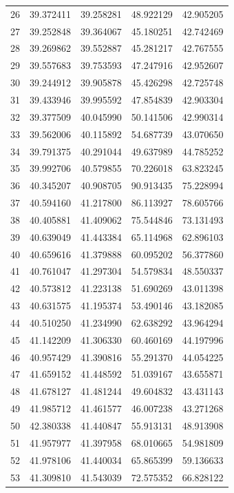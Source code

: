\begin{table}
\begin{tabular}{rrrrr}
26 & 39.372411 & 39.258281 & 48.922129 & 42.905205 \\
27 & 39.252848 & 39.364067 & 45.180251 & 42.742469 \\
28 & 39.269862 & 39.552887 & 45.281217 & 42.767555 \\
29 & 39.557683 & 39.753593 & 47.247916 & 42.952607 \\
30 & 39.244912 & 39.905878 & 45.426298 & 42.725748 \\
31 & 39.433946 & 39.995592 & 47.854839 & 42.903304 \\
32 & 39.377509 & 40.045990 & 50.141506 & 42.990314 \\
33 & 39.562006 & 40.115892 & 54.687739 & 43.070650 \\
34 & 39.791375 & 40.291044 & 49.637989 & 44.785252 \\
35 & 39.992706 & 40.579855 & 70.226018 & 63.823245 \\
36 & 40.345207 & 40.908705 & 90.913435 & 75.228994 \\
37 & 40.594160 & 41.217800 & 86.113927 & 78.605766 \\
38 & 40.405881 & 41.409062 & 75.544846 & 73.131493 \\
39 & 40.639049 & 41.443384 & 65.114968 & 62.896103 \\
40 & 40.659616 & 41.379888 & 60.095202 & 56.377860 \\
41 & 40.761047 & 41.297304 & 54.579834 & 48.550337 \\
42 & 40.573812 & 41.223138 & 51.690269 & 43.011398 \\
43 & 40.631575 & 41.195374 & 53.490146 & 43.182085 \\
44 & 40.510250 & 41.234990 & 62.638292 & 43.964294 \\
45 & 41.142209 & 41.306330 & 60.460169 & 44.197996 \\
46 & 40.957429 & 41.390816 & 55.291370 & 44.054225 \\
47 & 41.659152 & 41.448592 & 51.039167 & 43.655871 \\
48 & 41.678127 & 41.481244 & 49.604832 & 43.431143 \\
49 & 41.985712 & 41.461577 & 46.007238 & 43.271268 \\
50 & 42.380338 & 41.440847 & 55.913131 & 48.913908 \\
51 & 41.957977 & 41.397958 & 68.010665 & 54.981809 \\
52 & 41.978106 & 41.440034 & 65.865399 & 59.136633 \\
53 & 41.309810 & 41.543039 & 72.575352 & 66.828122 \\

\end{tabular}
\end{table}
